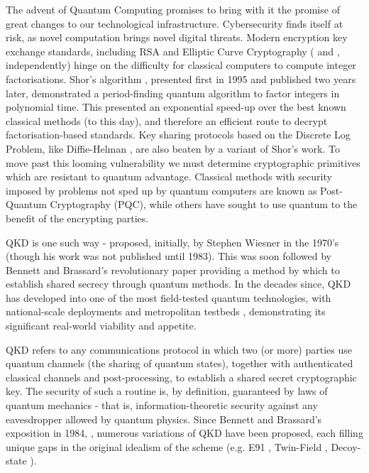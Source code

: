 \documentclass[9pt,technote]{IEEEtran}
\begin{document}
The advent of Quantum Computing promises to bring with it the promise of great changes to our technological infrastructure. Cybersecurity finds itself at risk, as novel computation brings novel digital threats. Modern encryption key exchange standards, including RSA \cite{RSA_1978} and Elliptic Curve Cryptography (\cite{Koblitz_ECC} and \cite{Miller_ECC}, independently) hinge on the difficulty for classical computers to compute integer factorisations. Shor's algorithm \cite{Shor_1997}, presented first in 1995 and published two years later, demonstrated a period-finding quantum algorithm to factor integers in polynomial time. This presented an exponential speed-up over the best known classical methods (to this day), and therefore an efficient route to decrypt factorisation-based standards. Key sharing protocols based on the Discrete Log Problem, like Diffie-Helman \cite{DiffieHellman}, are also beaten by a variant of Shor's work. To move past this looming vulnerability we must determine cryptographic primitives which are resistant to quantum advantage. Classical methods with security imposed by problems not sped up by quantum computers are known as Post-Quantum Cryptography (PQC), while others have sought to use quantum to the benefit of the encrypting parties.

QKD is one such way - proposed, initially, by Stephen Wiesner \cite{Wiesner_1983} in the 1970's (though his work was not published until 1983). This was soon followed by Bennett and Brassard's revolutionary paper \cite{Bennett_2014} providing a method by which to establish shared secrecy through quantum methods. In the decades since, QKD has developed into one of the most field-tested quantum technologies, with national-scale deployments \cite{chen2021} and metropolitan testbeds \cite{Peev_2009}, \cite{Sasaki_2011} demonstrating its significant real-world viability and appetite.

QKD refers to any communications protocol in which two (or more) parties use quantum channels (the sharing of quantum states), together with authenticated classical channels and post-processing, to establish a shared secret cryptographic key. The security of such a routine is, by definition, guaranteed by laws of quantum mechanics - that is, information-theoretic security against any eavesdropper allowed by quantum physics. Since Bennett and Brassard's exposition in 1984, \cite{Bennett_2014}, numerous variations of QKD have been proposed, each filling unique gaps in the original idealism of the scheme (e.g. E91 \cite{Ekert91}, Twin-Field \cite{Lucamarini_2018}, Decoy-state \cite{Lo_decoys}).
\end{document}
